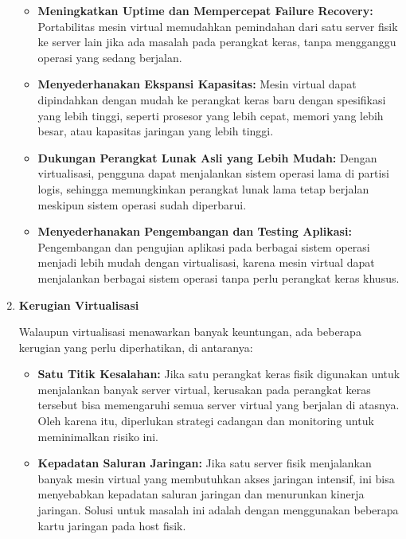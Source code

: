 \documentclass[12pt]{article}
\begin{document}
\begin{enumerate}
\begin{itemize}
    \item \textbf{Meningkatkan Uptime dan Mempercepat Failure Recovery:} 
    Portabilitas mesin virtual memudahkan pemindahan dari satu server fisik ke server lain jika ada masalah pada perangkat keras, tanpa mengganggu operasi yang sedang berjalan.
    
    \item \textbf{Menyederhanakan Ekspansi Kapasitas:} 
    Mesin virtual dapat dipindahkan dengan mudah ke perangkat keras baru dengan spesifikasi yang lebih tinggi, seperti prosesor yang lebih cepat, memori yang lebih besar, atau kapasitas jaringan yang lebih tinggi.
    
    \item \textbf{Dukungan Perangkat Lunak Asli yang Lebih Mudah:} 
    Dengan virtualisasi, pengguna dapat menjalankan sistem operasi lama di partisi logis, sehingga memungkinkan perangkat lunak lama tetap berjalan meskipun sistem operasi sudah diperbarui.
    
    \item \textbf{Menyederhanakan Pengembangan dan Testing Aplikasi:} 
    Pengembangan dan pengujian aplikasi pada berbagai sistem operasi menjadi lebih mudah dengan virtualisasi, karena mesin virtual dapat menjalankan berbagai sistem operasi tanpa perlu perangkat keras khusus.
\end{itemize}


    \item \textbf{Kerugian Virtualisasi}
    \par Walaupun virtualisasi menawarkan banyak keuntungan, ada beberapa kerugian yang perlu diperhatikan, di antaranya:

\begin{itemize}
    \item \textbf{Satu Titik Kesalahan:} 
    Jika satu perangkat keras fisik digunakan untuk menjalankan banyak server virtual, kerusakan pada perangkat keras tersebut bisa memengaruhi semua server virtual yang berjalan di atasnya. Oleh karena itu, diperlukan strategi cadangan dan monitoring untuk meminimalkan risiko ini.
    
    \item \textbf{Kepadatan Saluran Jaringan:} 
    Jika satu server fisik menjalankan banyak mesin virtual yang membutuhkan akses jaringan intensif, ini bisa menyebabkan kepadatan saluran jaringan dan menurunkan kinerja jaringan. Solusi untuk masalah ini adalah dengan menggunakan beberapa kartu jaringan pada host fisik.
    

\end{itemize}
\end{enumerate}
\end{document}

